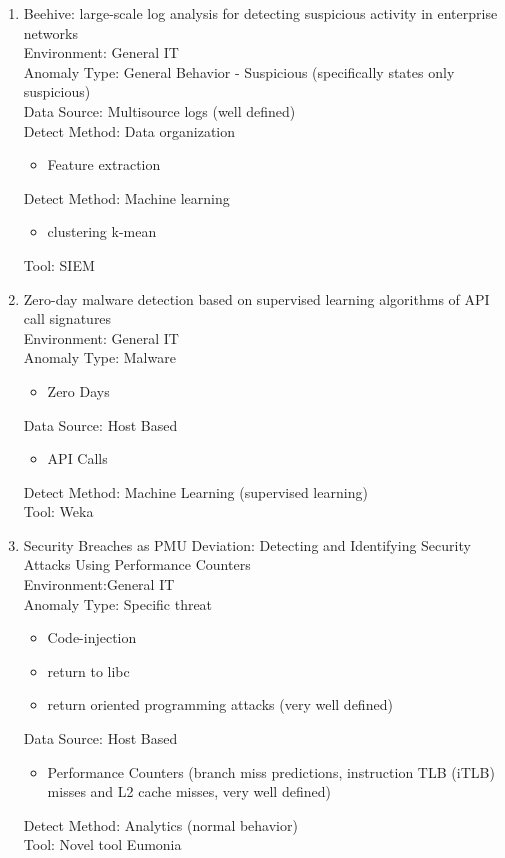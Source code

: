 \begin{enumerate}
    \item 
    Beehive: large-scale log analysis for detecting suspicious activity in enterprise networks\cite{yen2013beehive}\\
    Environment: General IT\\
    Anomaly Type: General Behavior - Suspicious (specifically states only suspicious)\\
    Data Source: Multisource logs (well defined)\\
    Detect Method: Data organization
    \begin{itemize}
        \item Feature extraction
    \end{itemize}
    Detect Method: Machine learning 
    \begin{itemize}
        \item clustering k-mean
    \end{itemize}
    Tool: SIEM 
    
    \item 
    Zero-day malware detection based on supervised learning algorithms of API call signatures\cite{alazab2011zero}\\
    Environment: General IT\\
    Anomaly Type: Malware
    \begin{itemize}
        \item Zero Days
    \end{itemize}
    Data Source: Host Based
    \begin{itemize}
        \item API Calls
    \end{itemize}
    Detect Method: Machine Learning (supervised learning)  \\
    Tool: Weka
    
    \item
    Security Breaches as PMU Deviation: Detecting and Identifying Security Attacks Using Performance Counters\cite{yuan2011security}\\
    Environment:General IT\\
    Anomaly Type: Specific threat
    \begin{itemize}
        \item Code-injection
        \item return to libc
        \item return oriented programming attacks (very well defined)
    \end{itemize}
    Data Source: Host Based
    \begin{itemize}
        \item Performance Counters (branch miss predictions, instruction TLB (iTLB) misses and L2 cache misses, very well defined) \\
    \end{itemize}
    Detect Method: Analytics (normal behavior) \\
    Tool: Novel tool Eumonia 
   

\end{enumerate}
